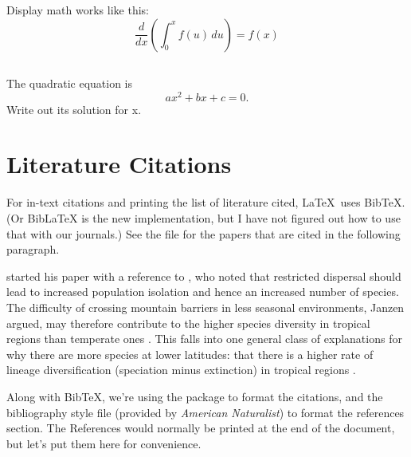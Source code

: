 \documentclass{article}
\begin{document}
Display math works like this:
\begin{equation}
    \frac{d}{dx} \left( \int_{0}^{x} f(u)\, du \right) = f(x)
\label{eq:deriv}
\end{equation}


\subsection{\task}

The quadratic equation is
\begin{equation}
    a x^2 + b x + c = 0.
\label{eq:quadratic}
\end{equation}
Write out its solution for x.

\section{Literature Citations}
\label{sec:literature}

For in-text citations and printing the list of literature cited, \LaTeX\ uses BibTeX.
(Or BibLaTeX is the new implementation, but I have not figured out how to use that with our journals.)
See the  file for the papers that are cited in the following paragraph.

\citet{Janzen1967} started his paper with a reference to \citet{Simpson1964}, who noted that restricted dispersal should lead to increased population isolation and hence an increased number of species.
The difficulty of crossing mountain barriers in less seasonal environments, Janzen argued, may therefore contribute to the higher species diversity in tropical regions than temperate ones \citep{Ghalambor2006}.
This falls into one general class of explanations for why there are more species at lower latitudes: that there is a higher rate of lineage diversification (speciation minus extinction) in tropical regions               \citep{Ricklefs2006, Weir2007, Mittelbach2007}.

Along with BibTeX, we're using the package  to format the citations, and the bibliography style file  (provided by \emph{American Naturalist}) to format the references section.
The References would normally be printed at the end of the document, but let's put them here for convenience.
\end{document}
